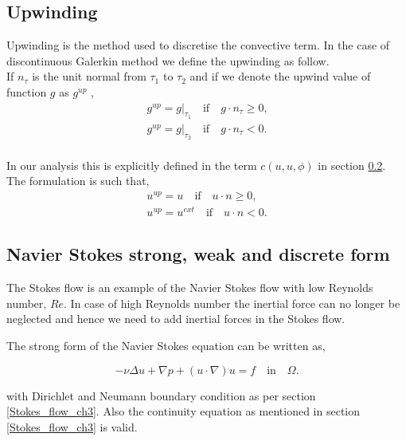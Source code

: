 \documentclass[a4paper,twoside,openright]{book}
\begin{document}
\subsection{Upwinding} \label{upwinding}

Upwinding is the method used to discretise the convective term. In the case of discontinuous Galerkin method we define the upwinding as follow.\\

If $n_\tau$ is the unit normal from $\tau_1$ to $\tau_2$ and if we denote the upwind value of function $g$ as $g^{up}$ \cite{riviere},
\begin{equation}
\begin{split}
g^{up} = g|_{\tau_1} \quad \textrm{if} \quad g \cdot n_\tau \geq 0 \textrm{,} \\
g^{up} = g|_{\tau_2} \quad \textrm{if} \quad g \cdot n_\tau < 0 \textrm{.}
\end{split}
\end{equation}
\\
In our analysis this is explicitly defined in the term $c(u,u,\phi)$ in section \ref{n_s_ch3}. The formulation is such that,
\begin{equation}
\begin{split}
u^{up} = u \quad \textrm{if} \quad u \cdot n \geq 0 \textrm{,}\\
u^{up} = u^{ext} \quad \textrm{if} \quad u \cdot n < 0 \textrm{.}
\end{split}
\end{equation}

\subsection{Navier Stokes strong, weak and discrete form} \label{n_s_ch3}

The Stokes flow is an example of the Navier Stokes flow with low Reynolds number, $Re$. In case of high Reynolds number the inertial force can no longer be neglected and hence we need to add inertial forces in the Stokes flow. 

The strong form of the Navier Stokes equation can be written as,

\begin{equation} \label{navier_stokes_strong_ch3}
-\nu \Delta u + \nabla p + (u \cdot \nabla) u = f \quad \textrm{in} \quad \Omega \textrm{.}
\end{equation}

with Dirichlet and Neumann boundary condition as per section \ref{Stokes_flow_ch3}. Also the continuity equation as mentioned in section \ref{Stokes_flow_ch3} is valid.
\end{document}
